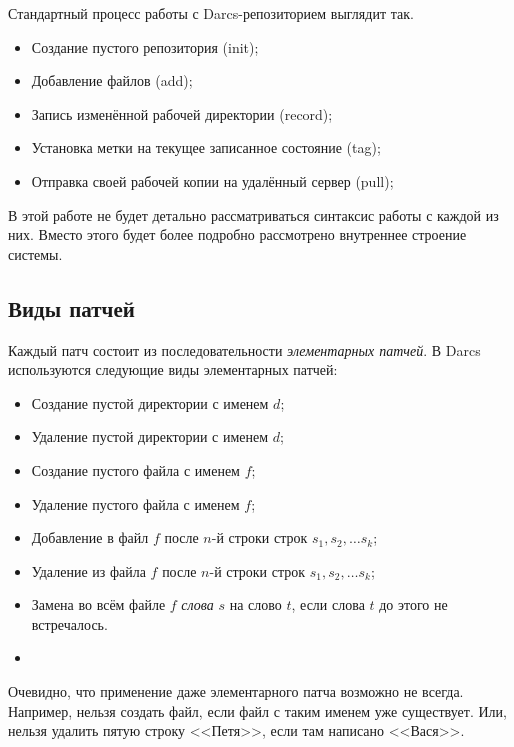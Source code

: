 Стандартный процесс работы с Darcs-репозиторием выглядит так. 

\begin{itemize}
\item Создание пустого репозитория (init);
\item Добавление файлов (add);
\item Запись изменённой рабочей директории (record);
\item Установка метки на текущее записанное состояние (tag);
\item Отправка своей рабочей копии на удалённый сервер (pull);
\end{itemize}

В этой работе не будет детально рассматриваться синтаксис работы с
каждой из них. Вместо этого будет более подробно рассмотрено
внутреннее строение системы.

\subsection{Виды патчей}

Каждый патч состоит из последовательности \emph{элементарных патчей}. 
В Darcs используются следующие виды элементарных патчей:

\begin{definition}
\begin{itemize}
\item Создание пустой директории с именем $d$;
\item Удаление пустой директории с именем $d$;
\item Создание пустого файла с именем $f$;
\item Удаление пустого файла с именем $f$;
\item Добавление в файл $f$ после $n$-й строки строк $s_1, s_2, \ldots s_k$;
\item Удаление из файла $f$ после $n$-й строки строк $s_1, s_2, \ldots s_k$;
\item Замена во всём файле $f$ \emph{слова} $s$ на слово $t$, если
  слова $t$ до этого не встречалось.
\item 
\end{itemize}
\end{definition}

Очевидно, что применение даже элементарного патча возможно не всегда.
Например, нельзя создать файл, если файл с таким именем уже
существует. Или, нельзя удалить пятую строку <<Петя>>, если там
написано <<Вася>>.

